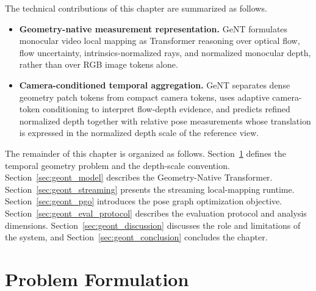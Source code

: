 The technical contributions of this chapter are summarized as follows.
\begin{itemize}[leftmargin=*]
    \item \textbf{Geometry-native measurement representation.}
    GeNT formulates monocular video local mapping as Transformer reasoning over optical flow, flow uncertainty, intrinsics-normalized rays, and normalized monocular depth, rather than over RGB image tokens alone.
    \item \textbf{Camera-conditioned temporal aggregation.}
    GeNT separates dense geometry patch tokens from compact camera tokens, uses adaptive camera-token conditioning to interpret flow-depth evidence, and predicts refined normalized depth together with relative pose measurements whose translation is expressed in the normalized depth scale of the reference view.
\end{itemize}

The remainder of this chapter is organized as follows.
Section~\ref{sec:geont_problem} defines the temporal geometry problem and the depth-scale convention.
Section~\ref{sec:geont_model} describes the Geometry-Native Transformer.
Section~\ref{sec:geont_streaming} presents the streaming local-mapping runtime.
Section~\ref{sec:geont_pgo} introduces the pose graph optimization objective.
Section~\ref{sec:geont_eval_protocol} describes the evaluation protocol and analysis dimensions.
Section~\ref{sec:geont_discussion} discusses the role and limitations of the system, and Section~\ref{sec:geont_conclusion} concludes the chapter.

\section{Problem Formulation}
\label{sec:geont_problem}

